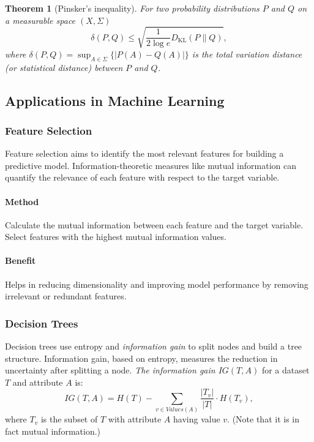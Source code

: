 \documentclass[12pt,sans]{article}
\theoremstyle{definition}
\theoremstyle{plain}
\newtheorem{theorem}{Theorem}[section]
\theoremstyle{remark}
\begin{document}
\begin{theorem}[Pinsker's inequality]
     For two probability distributions $P$ and $Q$ on a measurable space $(X,\Sigma)$
    \[
    \delta (P,Q)\leq {\sqrt {{\frac {1}{2\log e}}D_{\mathrm {KL} }(P\parallel Q)}},
    \]
    where $\delta (P,Q)=\sup_{A\in \Sigma} \bigl \{ |P(A)-Q(A)|\bigr \}$ is the total variation distance (or statistical distance) between $P$ and $Q$.
\end{theorem}

\subsection{Applications in Machine Learning}
\subsubsection{Feature Selection}

Feature selection aims to identify the most relevant features for building a predictive model. Information-theoretic measures like mutual information can quantify the relevance of each feature with respect to the target variable.

\paragraph{Method} Calculate the mutual information between each feature and the target variable. Select features with the highest mutual information values.

\paragraph{Benefit} Helps in reducing dimensionality and improving model performance by removing irrelevant or redundant features.

\subsubsection{Decision Trees}

Decision trees use entropy and \emph{information gain} to split nodes and build a tree structure. Information gain, based on entropy, measures the reduction in uncertainty after splitting a node.
\emph{The information gain $IG(T,A)$} for a dataset $T$ and attribute $A$ is:
\[
    IG(T,A) = H(T) - \sum_{v \in Values(A)} \frac{|T_v|}{|T|}\cdot H(T_v),
\]
where $T_v$ is the subset of $T$ with attribute $A$ having value $v$.
(Note that it is in fact mutual information.)
\end{document}
